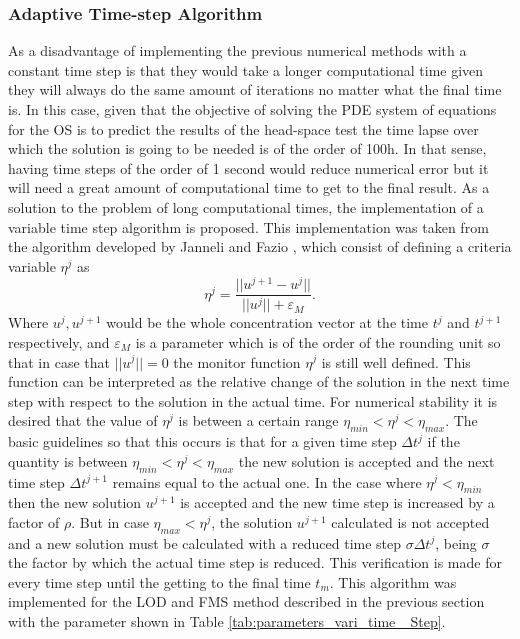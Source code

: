 \begin{refsection}
\subsubsection{Adaptive Time-step Algorithm}
As a disadvantage of implementing the previous numerical methods with a constant time step is that they would take a longer computational time given they will always do the same amount of iterations no matter what the final time is. In this case, given that the objective of solving the PDE system of equations for the OS is to predict the results of the head-space test the time lapse over which the solution is going to be needed is of the order of 100h. In that sense, having time steps of the order of 1 second would reduce numerical error but it will need a great amount of computational time to get to the final result. As a solution to the problem of long computational times, the implementation of a variable time step algorithm is proposed. This implementation was taken from the algorithm developed by Janneli and Fazio \cite{Jannelli2006AdaptiveComplexity}, which consist of defining a criteria variable $\eta^j$ as
\begin{equation}
    \eta^j= \frac{||u^{j+1}-u^{j}||}{||u^{j}||+\varepsilon_M}.
\end{equation}
Where $u^j,u^{j+1} $ would be the whole concentration vector at the time $t^j$ and $t^{j+1}$ respectively, and $\varepsilon_M$ is a parameter which is of the order of the rounding unit so that in case that $||u^{j}||=0$ the monitor function  $\eta^j$ is still well defined. This function can be interpreted as the relative change of the solution in the next time step  with respect to the solution in the actual time. For numerical stability  it is desired that the value of $\eta^j$ is between a certain range $ \eta_{min}<\eta^j <\eta_{max}$. The basic guidelines so that this occurs is that for a given time step $\Delta t^j$ if the quantity is between $ \eta_{min}<\eta^j <\eta_{max}$ the new solution is accepted and the next time step $\Delta t^{j+1}$ remains equal to the actual one. In the case where $\eta^j<\eta_{min}$ then the new solution $u^{j+1}$ is accepted and the new time step is increased by a factor of $\rho$. But in case $ \eta_{max}<\eta^j$, the solution $u^{j+1}$ calculated is not accepted and a new solution must be calculated with a reduced time step $\sigma \Delta t^j$, being $\sigma$ the factor by which the actual time step is reduced. This verification is made for every time step until the getting to the final time $t_m$. This algorithm was implemented for the LOD and FMS method described in the previous section  with the parameter shown in Table \ref{tab:parameters_vari_time _Step}.



\end{refsection}
